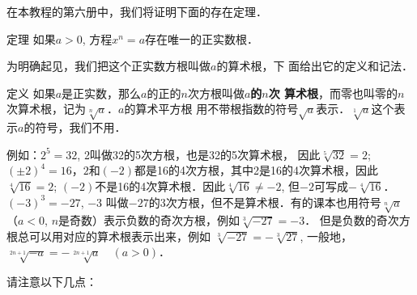 在本教程的第六册中，我们将证明下面的存在定理．


\begin{blk}{定理}
    如果$a>0$, 方程$x^n=a$存在唯一的正实数根．
\end{blk}

为明确起见，我们把这个正实数方根叫做$a$的算术根，下
面给出它的定义和记法．


\begin{blk}{定义}
    如果$a$是正实数，那么$a$的正的$n$次方根叫做\textbf{$a$的$n$次
算术根}，而零也叫零的$n$次算术根，记为$\sqrt[n]{a}$．$a$的算术平方根
用不带根指数的符号$\sqrt{a}$表示．$\sqrt[1]{a}$这个表示$a$的符号，我们不用．
\end{blk}

例如：$2^5=32$, 2叫做32的5次方根，也是32的5次算术根，
因此$\sqrt[5]{32}=2$; $(\pm 2)^4=16$，$2$和$(-2)$都是16的4次方根，其中2是16的4次算术根，因此$\sqrt[4]{16}=2$; $(-2)$不是16的4次算术根．因此$\sqrt[4]{16}\ne -2$, 但$-2$可写成$-\sqrt[4]{16}$．$(-3)^3=-27$, $-3$
叫做$-27$的3次方根，但不是算术根．有的课本也用符号$\sqrt[n]{a}$
（$a<0$, $n$是奇数）表示负数的奇次方根，例如$\sqrt[3]{-27}=-3$．
但是负数的奇次方根总可以用对应的算术根表示出来，例如
$\sqrt[3]{-27}=-\sqrt[3]{27}$, 一般地，$\sqrt[2n+1]{-a}=-\sqrt[2n+1]{a}\quad  (a>0)$．

请注意以下几点：

